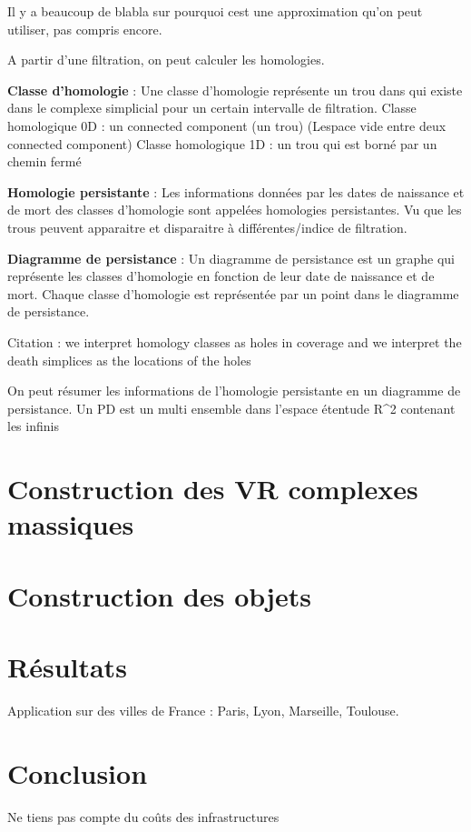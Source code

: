 \documentclass{article}
\begin{document}
Il y a beaucoup de blabla sur pourquoi cest une approximation qu'on peut utiliser,
pas compris encore.

A partir d'une filtration, on peut calculer les homologies.

\textbf{Classe d'homologie} : Une classe d'homologie représente un trou dans
qui existe dans le complexe simplicial pour un certain intervalle de filtration.
Classe homologique 0D : un connected component (un trou) (Lespace vide entre
deux connected component)
Classe homologique 1D : un trou qui est borné par un chemin fermé

\textbf{Homologie persistante} : Les informations données par les dates de 
naissance et de mort des classes d'homologie sont appelées homologies persistantes.
Vu que les trous peuvent apparaitre et disparaitre à différentes/indice de 
filtration.

\textbf{Diagramme de persistance} : Un diagramme de persistance est un graphe
qui représente les classes d'homologie en fonction de leur date de naissance
et de mort. Chaque classe d'homologie est représentée par un point dans le
diagramme de persistance.

Citation : we interpret homology classes as holes in coverage
and we interpret the death simplices as the locations of the holes

On peut résumer les informations de l'homologie persistante en un diagramme
de persistance. Un PD est un multi ensemble dans l'espace étentude R^2 
contenant les infinis

\section{Construction des VR complexes massiques}

\section{Construction des objets}

\section{Résultats}
Application sur des villes de France : Paris, Lyon, Marseille, Toulouse.

\section{Conclusion}
Ne tiens pas compte du coûts des infrastructures
\end{document}

